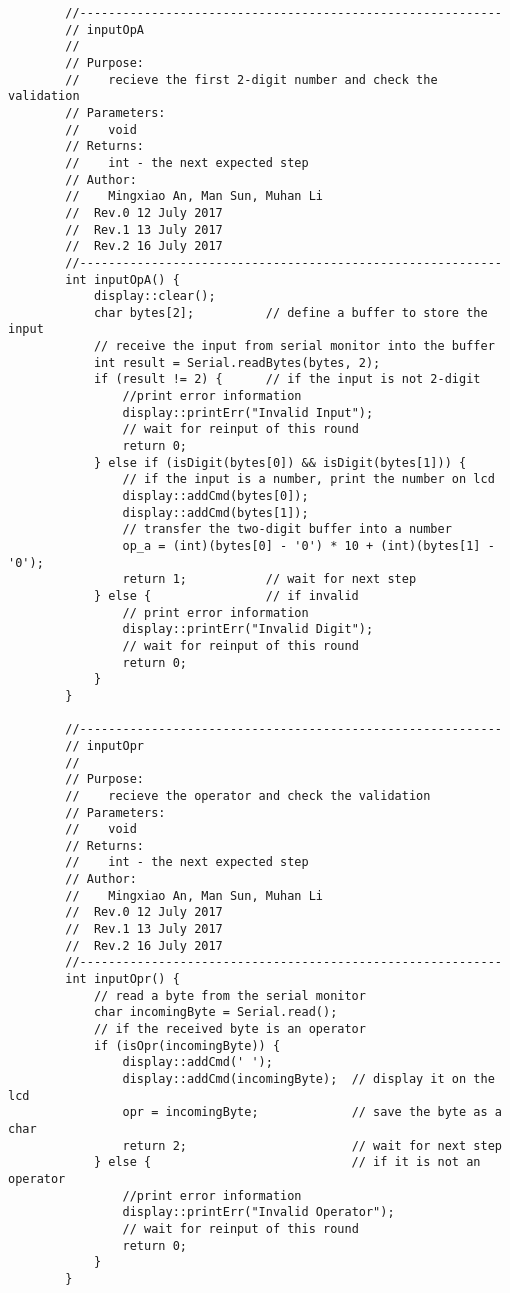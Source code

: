 \begin{verbatim}
        //-----------------------------------------------------------  
        // inputOpA 
        //  
        // Purpose:  
        //    recieve the first 2-digit number and check the validation
        // Parameters:  
        //    void 
        // Returns:  
        //    int - the next expected step   
        // Author:  
        //    Mingxiao An, Man Sun, Muhan Li
        //  Rev.0 12 July 2017
        //  Rev.1 13 July 2017
        //  Rev.2 16 July 2017
        //-----------------------------------------------------------
        int inputOpA() {
            display::clear();
            char bytes[2];          // define a buffer to store the input
            // receive the input from serial monitor into the buffer                    
            int result = Serial.readBytes(bytes, 2);
            if (result != 2) {      // if the input is not 2-digit
                //print error information
                display::printErr("Invalid Input");
                // wait for reinput of this round
                return 0;
            } else if (isDigit(bytes[0]) && isDigit(bytes[1])) {
                // if the input is a number, print the number on lcd
                display::addCmd(bytes[0]);
                display::addCmd(bytes[1]);
                // transfer the two-digit buffer into a number
                op_a = (int)(bytes[0] - '0') * 10 + (int)(bytes[1] - '0');
                return 1;           // wait for next step
            } else {                // if invalid
                // print error information
                display::printErr("Invalid Digit");
                // wait for reinput of this round
                return 0;
            }
        }

        //-----------------------------------------------------------  
        // inputOpr 
        //  
        // Purpose:  
        //    recieve the operator and check the validation
        // Parameters:  
        //    void 
        // Returns:  
        //    int - the next expected step   
        // Author:  
        //    Mingxiao An, Man Sun, Muhan Li
        //  Rev.0 12 July 2017
        //  Rev.1 13 July 2017
        //  Rev.2 16 July 2017
        //-----------------------------------------------------------
        int inputOpr() {
            // read a byte from the serial monitor
            char incomingByte = Serial.read();
            // if the received byte is an operator
            if (isOpr(incomingByte)) {
                display::addCmd(' ');
                display::addCmd(incomingByte);  // display it on the lcd
                opr = incomingByte;             // save the byte as a char
                return 2;                       // wait for next step
            } else {                            // if it is not an operator
                //print error information
                display::printErr("Invalid Operator");
                // wait for reinput of this round
                return 0;
            }
        }


\end{verbatim}
